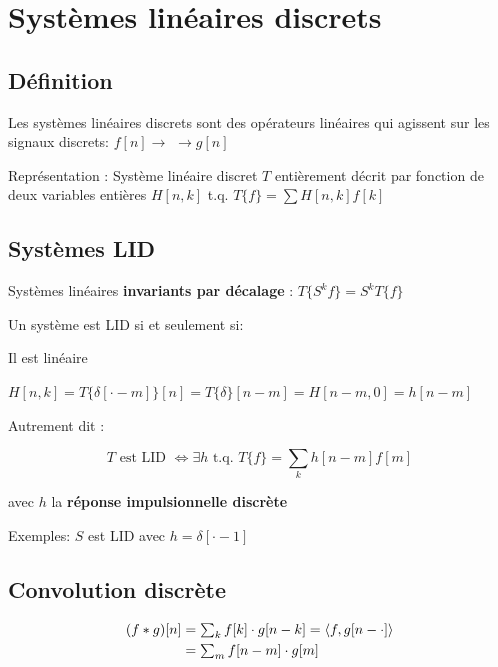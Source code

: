 
\section{Systèmes linéaires discrets}

\subsection*{Définition}

Les systèmes linéaires discrets sont des opérateurs linéaires qui agissent sur les signaux discrets: $f[n] \rightarrow$  $\rightarrow g[n]$

Représentation : Système linéaire discret $T$ entièrement décrit par fonction de deux variables entières $H[n,k]$ t.q. $T\{f\} = \sum H[n,k] f[k]$

\subsection*{Systèmes LID}

Systèmes linéaires \textbf{invariants par décalage} : $T\{S^kf\} = S^kT\{f\}$

Un système est LID si et seulement si:
\begin{enum}
\item Il est linéaire
\item $H[n,k] = T\{\delta[\cdot-m] \}[n] = T\{\delta \}[n-m] = H[n-m,0]=h[n-m]$
\end{enum}

Autrement dit :

\begin{equation*}
    T \text{ est LID } \iff \exists h \text{ t.q. } T\{f \} = \sum_k h[n-m]f[m]
\end{equation*}

avec $h$ la \textbf{réponse impulsionnelle discrète}

Exemples: $S$ est LID avec $h=\delta[\cdot-1]$

\subsection*{Convolution discrète}

\begin{align*}
    (f*g)[n] & = \textstyle\sum_k f[k] \cdot g[n-k] = \langle f, g[n-\cdot ] \rangle \\
    & = \textstyle\sum_m f[n-m] \cdot g[m]
\end{align*}

